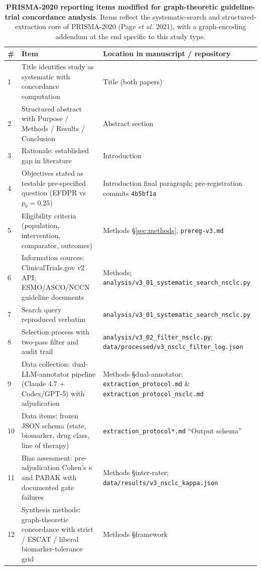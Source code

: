 \begin{table}[H]
\centering
\caption{\textbf{PRISMA-2020 reporting items modified for graph-theoretic guideline-trial concordance analysis}. Items reflect the systematic-search and structured-extraction core of PRISMA-2020 (Page \textit{et al.} 2021), with a graph-encoding addendum at the end specific to this study type.}
\label{tab:S1}
\footnotesize
\begin{tabular}{@{}p{}p{}p{}@{}}
\toprule
\# & Item & Location in manuscript / repository \\
\midrule
1 & Title identifies study as systematic with concordance computation & Title (both papers) \\
2 & Structured abstract with Purpose / Methods / Results / Conclusion & Abstract section \\
3 & Rationale: established gap in literature & Introduction \\
4 & Objectives stated as testable pre-specified question (EFDPR vs $p_0=0.25$) & Introduction final paragraph; pre-registration commits \texttt{4b5bf1a} \\
5 & Eligibility criteria (population, intervention, comparator, outcomes) & Methods §\ref{sec:methods}, \texttt{prereg-v3.md} \\
6 & Information sources: ClinicalTrials.gov v2 API; ESMO/ASCO/NCCN guideline documents & Methods; \texttt{analysis/v3\_01\_systematic\_search\_nsclc.py} \\
7 & Search query reproduced verbatim & \texttt{analysis/v3\_01\_systematic\_search\_nsclc.py} \\
8 & Selection process with two-pass filter and audit trail & \texttt{analysis/v3\_02\_filter\_nsclc.py}; \texttt{data/processed/v3\_nsclc\_filter\_log.json} \\
9 & Data collection: dual-LLM-annotator pipeline (Claude 4.7 + Codex/GPT-5) with adjudication & Methods §dual-annotator; \texttt{extraction\_protocol.md} \& \texttt{extraction\_protocol\_nsclc.md} \\
10 & Data items: frozen JSON schema (state, biomarker, drug class, line of therapy) & \texttt{extraction\_protocol*.md} ``Output schema'' \\
11 & Bias assessment: pre-adjudication Cohen's $\kappa$ and PABAK with documented gate failures & Methods §inter-rater; \texttt{data/results/v3\_nsclc\_kappa.json} \\
12 & Synthesis methods: graph-theoretic concordance with strict / ESCAT / liberal biomarker-tolerance grid & Methods §framework \\

\end{tabular}
\end{table}
